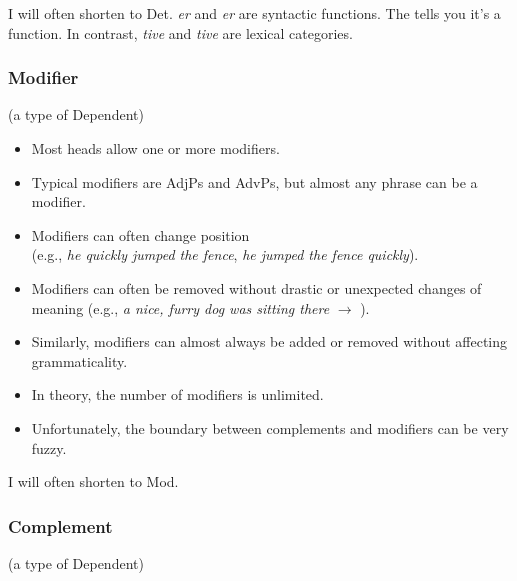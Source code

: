 I will often shorten  to Det. \emph{er} and \emph{er} are syntactic functions. The  tells you it's a function. In contrast, \emph{tive} and \emph{tive} are lexical categories.

\subsubsection{Modifier}\label{sec:modifier}
(a type of Dependent)

\begin{itemize}[noitemsep]
    \item {}Most heads allow one or more modifiers.
    \item Typical modifiers are AdjPs and AdvPs, but almost any phrase can be a modifier.
    \item Modifiers can often change position \\(e.g., \textit{he \emph{quickly} jumped the fence}, \textit{he jumped the fence \emph{quickly}}).
    \item Modifiers can often be removed without drastic or unexpected changes of meaning (e.g., \textit{a \emph{nice, furry} dog was sitting there} $\rightarrow$ ).
    \item Similarly, modifiers can almost always be added or removed without affecting grammaticality.
    \item In theory, the number of modifiers is unlimited.
    \item Unfortunately, the boundary between complements and modifiers can be very fuzzy.
\end{itemize}

I will often shorten  to Mod.

\subsubsection{Complement}\label{sec:complement}
(a type of Dependent)

